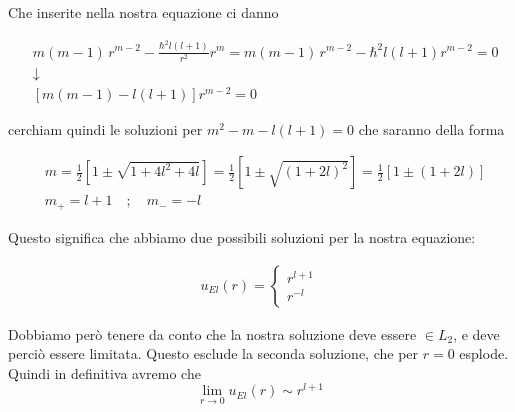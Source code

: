Che inserite nella nostra equazione ci danno

\begin{align}
{}&m(m-1) \, r^{m-2} - \frac{\hbar^2 l(l+1)}{r^2}r^m= m(m-1) \, r^{m-2} -  \hbar^2 l(l+1)r^{m-2}=0 \nonumber\\
&\downarrow \nonumber \\
&[m(m-1) - l(l+1)]r^{m-2}=0
\end{align}

cerchiam quindi le soluzioni per $m^2 - m - l(l+1)=0$ che saranno della forma

\begin{align}
{}&m = \frac{1}{2}[1 \pm \sqrt{1 + 4l^2 + 4l}] = \frac{1}{2} [1 \pm \sqrt{(1 + 2l)^2}] = \frac{1}{2} [1 \pm (1 + 2l)]\\
&m_+ = l+1 \quad ; \quad m_-= -l
\end{align}

Questo significa che abbiamo due possibili soluzioni per la nostra equazione:

\begin{align}
u_{E l}(r) = \left\{
\begin{array}{cc}
r^{l+1}\\r^{-l}
\end{array}
\right.
\end{align}

\newpage

Dobbiamo però tenere da conto che la nostra soluzione deve essere $\in L_2$, e deve perciò essere limitata. Questo esclude la seconda soluzione, che per $r=0$ esplode. Quindi in definitiva avremo che 
\begin{equation}
\lim_{r \rightarrow 0} u_{E l}(r)  \sim r^{l+1}
\end{equation}

